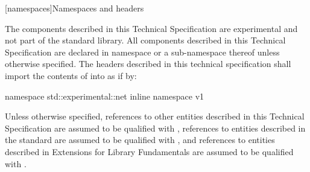 
[namespaces]{Namespaces and headers}

\pnum
The components described in this Technical Specification are experimental and not part of the \Cpp standard library. All components described in this Technical Specification are declared in namespace  or a sub-namespace thereof unless otherwise specified. The headers described in this technical specification shall import the contents of  into  as if by:

\begin{codeblock}
namespace std::experimental::net {
      inline namespace v1 {}
}
\end{codeblock}

\pnum
Unless otherwise specified, references to other entities described in this Technical Specification are assumed to be qualified with , references to entities described in the \Cpp standard are assumed to be qualified with , and references to entities described in \Cpp Extensions for Library Fundamentals are assumed to be qualified with .



